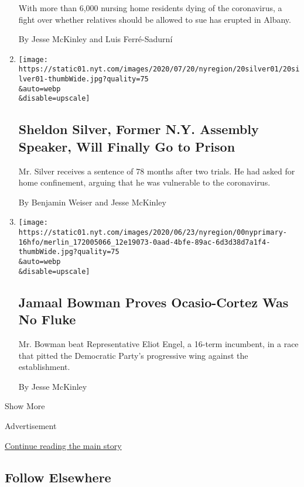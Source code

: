 \begin{enumerate}
  With more than 6,000 nursing home residents dying of the coronavirus,
  a fight over whether relatives should be allowed to sue has erupted in
  Albany.

  By Jesse McKinley and Luis Ferré-Sadurní
\item
  \href{/2020/07/20/nyregion/sheldon-silver-sentencing-prison.html}{}

  \texttt{[image: https://static01.nyt.com/images/2020/07/20/nyregion/20silver01/20silver01-thumbWide.jpg?quality=75\\\&auto=webp\\\&disable=upscale]}

  \hypertarget{sheldon-silver-former-ny-assembly-speaker-will-finally-go-to-prison}{%
  \subsection{Sheldon Silver, Former N.Y. Assembly Speaker, Will Finally
  Go to
  Prison}\label{sheldon-silver-former-ny-assembly-speaker-will-finally-go-to-prison}}

  Mr. Silver receives a sentence of 78 months after two trials. He had
  asked for home confinement, arguing that he was vulnerable to the
  coronavirus.

  By Benjamin Weiser and Jesse McKinley
\item
  \href{/2020/07/17/nyregion/jamaal-bowman-eliot-engel.html}{}

  \texttt{[image: https://static01.nyt.com/images/2020/06/23/nyregion/00nyprimary-16hfo/merlin\_172005066\_12e19073-0aad-4bfe-89ac-6d3d38d7a1f4-thumbWide.jpg?quality=75\\\&auto=webp\\\&disable=upscale]}

  \hypertarget{jamaal-bowman-proves-ocasio-cortez-was-no-fluke}{%
  \subsection{Jamaal Bowman Proves Ocasio-Cortez Was No
  Fluke}\label{jamaal-bowman-proves-ocasio-cortez-was-no-fluke}}

  Mr. Bowman beat Representative Eliot Engel, a 16-term incumbent, in a
  race that pitted the Democratic Party's progressive wing against the
  establishment.

  By Jesse McKinley
\end{enumerate}

Show More

Advertisement

\protect\hyperlink{after-mid2}{Continue reading the main story}

\hypertarget{follow-elsewhere}{%
\subsection{Follow Elsewhere}\label{follow-elsewhere}}

